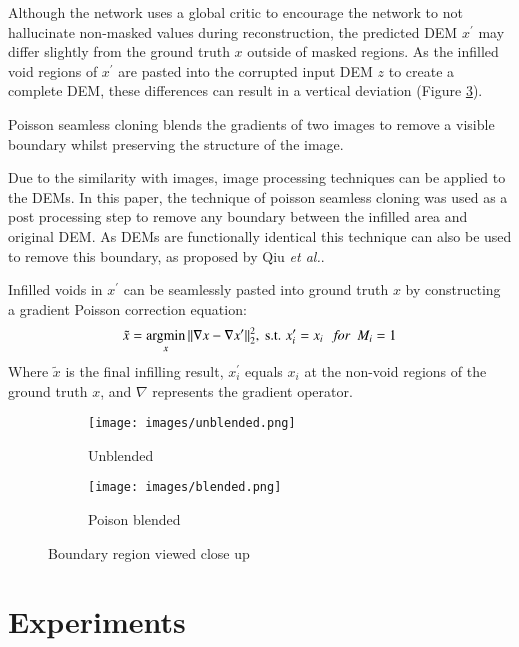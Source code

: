 \documentclass[twocolumn]{article}
\begin{document}
Although the network uses a global critic to encourage the network to not hallucinate non-masked values during reconstruction, the predicted DEM \(x^\prime\) may differ slightly from the ground truth \(x\) outside of masked regions.
As the infilled void regions of \(x^\prime\) are pasted into the corrupted input DEM \(z\) to create a complete DEM, these differences can result in a vertical deviation (Figure \ref{fig:poisson}).

Poisson seamless cloning\autocite{perezPoissonImageEditing2003} blends the gradients of two images to remove a visible boundary whilst preserving the structure of the image.

Due to the similarity with images, image processing techniques can be applied to the DEMs.
In this paper, the technique of poisson seamless cloning\autocite{perezPoissonImageEditing2003} was used as a post processing step to remove any boundary between the infilled area and original DEM.
As DEMs are functionally identical this technique can also be used to remove this boundary, as proposed by Qiu \emph{et al.}\autocite{qiuVoidFillingDigital2019}.

Infilled voids in \(x^\prime\) can be seamlessly pasted into ground truth \(x\) by constructing a gradient Poisson correction equation:
\begin{equation}
\tilde{x} = \operatorname*{argmin}_x \Vert \nabla x - \nabla x^\prime \Vert^2_2, \text{ s.t. } x^\prime_i = x_i  \text{ \space \space \it{for} \space } M_i = 1
\end{equation}
Where \(\tilde{x}\) is the final infilling result, \(x^\prime_i\) equals \(x_i\) at the non-void regions of the ground truth \(x\), and \(\nabla\) represents the gradient operator.

\begin{figure}
\centering
\begin{subfigure}{0.4\textwidth}
    \caption{Unblended}
    \texttt{[image: images/unblended.png]}
    \label{fig:unblended}
\end{subfigure}
\hfill
\begin{subfigure}{0.4\textwidth}
    \caption{Poison blended}
    \texttt{[image: images/blended.png]}
    \label{fig:blended}
\end{subfigure}
\caption{\label{fig:poisson}Boundary region viewed close up}
\end{figure}


\section{Experiments}
\label{sec:orgcffcba6}
\end{document}
